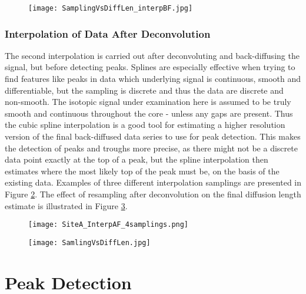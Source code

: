 \documentclass[../../CompleteThesis/Complete_1stDraft.tex]{subfiles}
\begin{document}
\begin{figure}[h]
	\centering
	\texttt{[image: SamplingVsDiffLen\_interpBF.jpg]}
	\caption{}
	\label{Fig:COMPMETH_SamplingVsDiffLen_interpBF}
\end{figure}



\subsubsection[Interpolation 2]{Interpolation of Data After Deconvolution}
\label{Subsubsec:CompMethod_StabilityTests_Interpolation2}
The second interpolation is carried out after deconvoluting and back-diffusing the signal, but before detecting peaks. Splines are especially effective when trying to find features like peaks in data which underlying signal is continuous, smooth and differentiable, but the sampling is discrete and thus the data are discrete and non-smooth. The isotopic signal under examination here is assumed to be truly smooth and continuous throughout the core - unless any gaps are present. Thus the cubic spline interpolation is a good tool for estimating a higher resolution version of the final back-diffused data series to use for peak detection. This makes the detection of peaks and troughs more precise, as there might not be a discrete data point exactly at the top of a peak, but the spline interpolation then estimates where the most likely top of the peak must be, on the basis of the existing data. Examples of three different interpolation samplings are presented in Figure \ref{Fig:COMPMETH_SiteA_InterpAF_4samplings}. The effect of resampling after deconvolution on the final diffusion length estimate is illustrated in Figure \ref{Fig:COMPMETH_SamlingVsDiffLen}.

\begin{figure}[h]
	\centering
	\texttt{[image: SiteA\_InterpAF\_4samplings.png]}
	\caption{}
	\label{Fig:COMPMETH_SiteA_InterpAF_4samplings}
\end{figure}

\begin{figure}[h]
	\centering
	\texttt{[image: SamlingVsDiffLen.jpg]}
	\caption{}
	\label{Fig:COMPMETH_SamlingVsDiffLen}
\end{figure}

\section[Peak Detection]{Peak Detection}
\label{Sec:CompMeths_PeakDetection}
\end{document}
